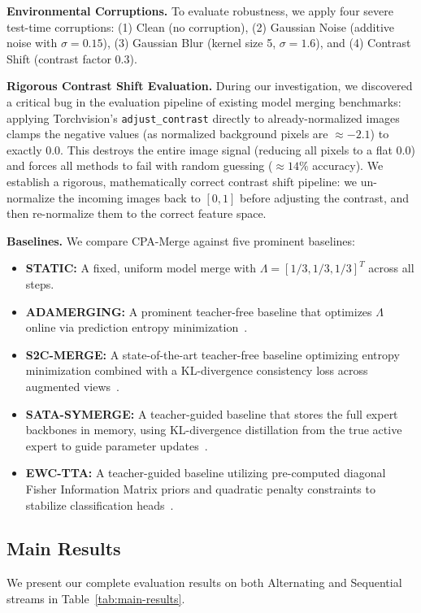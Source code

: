 \documentclass{article}
\theoremstyle{plain}
\theoremstyle{definition}
\theoremstyle{remark}
\begin{document}
\textbf{Environmental Corruptions.} To evaluate robustness, we apply four severe test-time corruptions: (1) Clean (no corruption), (2) Gaussian Noise (additive noise with $\sigma = 0.15$), (3) Gaussian Blur (kernel size 5, $\sigma = 1.6$), and (4) Contrast Shift (contrast factor 0.3). 

\textbf{Rigorous Contrast Shift Evaluation.} During our investigation, we discovered a critical bug in the evaluation pipeline of existing model merging benchmarks: applying Torchvision's \texttt{adjust\_contrast} directly to already-normalized images clamps the negative values (as normalized background pixels are $\approx -2.1$) to exactly 0.0. This destroys the entire image signal (reducing all pixels to a flat 0.0) and forces all methods to fail with random guessing ($\approx 14\%$ accuracy). We establish a rigorous, mathematically correct contrast shift pipeline: we un-normalize the incoming images back to $[0, 1]$ before adjusting the contrast, and then re-normalize them to the correct feature space.

\textbf{Baselines.} We compare CPA-Merge against five prominent baselines:
\begin{itemize}
    \item \textbf{STATIC:} A fixed, uniform model merge with $\Lambda = [1/3, 1/3, 1/3]^T$ across all steps.
    \item \textbf{ADAMERGING:} A prominent teacher-free baseline that optimizes $\Lambda$ online via prediction entropy minimization~\cite{yang2024adamerging}.
    \item \textbf{S2C-MERGE:} A state-of-the-art teacher-free baseline optimizing entropy minimization combined with a KL-divergence consistency loss across augmented views~\cite{s2cmerge2026}.
    \item \textbf{SATA-SYMERGE:} A teacher-guided baseline that stores the full expert backbones in memory, using KL-divergence distillation from the true active expert to guide parameter updates~\cite{sata2026}.
    \item \textbf{EWC-TTA:} A teacher-guided baseline utilizing pre-computed diagonal Fisher Information Matrix priors and quadratic penalty constraints to stabilize classification heads~\cite{ewctta2026}.
\end{itemize}

\subsection{Main Results}
We present our complete evaluation results on both Alternating and Sequential streams in Table~\ref{tab:main-results}.
\end{document}
